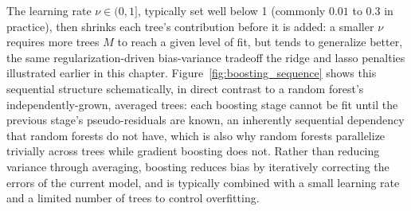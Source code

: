 \documentclass[../ai_in_finance]{subfiles}
\begin{document}
The learning rate $\nu \in (0,1]$, typically set well below 1 (commonly $0.01$ to $0.3$ in practice), then shrinks each tree's contribution before it is added: a smaller $\nu$ requires more trees $M$ to reach a given level of fit, but tends to generalize better, the same regularization-driven bias-variance tradeoff the ridge and lasso penalties illustrated earlier in this chapter. Figure~\ref{fig:boosting_sequence} shows this sequential structure schematically, in direct contrast to a random forest's independently-grown, averaged trees: each boosting stage cannot be fit until the previous stage's pseudo-residuals are known, an inherently sequential dependency that random forests do not have, which is also why random forests parallelize trivially across trees while gradient boosting does not.
Rather than reducing variance through averaging, boosting reduces bias by iteratively correcting the errors of the current model, and is typically combined with a small learning rate and a limited number of trees to control overfitting.

\begin{figure}[htbp]
\centering
\begin{lrbox}{\bookmeasuredbox}
\end{lrbox}
\ifdim\wd\bookmeasuredbox<0.65\linewidth
\setlength{\bookcapwidth}{0.65\linewidth}
\else
\setlength{\bookcapwidth}{\wd\bookmeasuredbox}
\fi
\end{figure}
\end{document}
